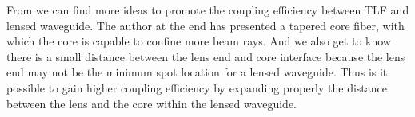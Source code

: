 From \cite{integrated_coupling_between_LD_SMF} we can find more ideas to promote the coupling efficiency between TLF and lensed waveguide. The author at the end has presented a tapered core fiber, with which the core is capable to confine more beam rays. And we also get to know there is a small distance between the lens end and core interface because the lens end may not be the minimum spot location for a lensed waveguide. Thus is it possible to gain higher coupling efficiency by expanding properly the distance between the lens and the core within the lensed waveguide.
